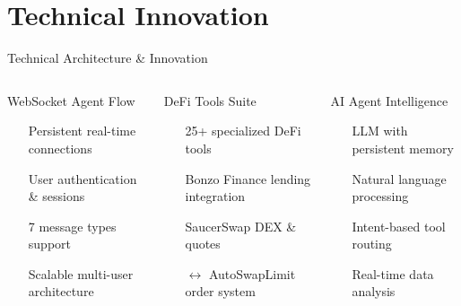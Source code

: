 \documentclass[aspectratio=169]{beamer}
\providecommand{\faExchangeAlt}{\faSync}
\providecommand{\faExpandArrowsAlt}{\ensuremath{\leftrightarrow}}
\providecommand{\faShieldAlt}{\faLock}
\providecommand{\faUsersCog}{\faUsers}
\providecommand{\faNetworkWired}{\faCogs}
\providecommand{\faLayerGroup}{\faCogs}
\begin{document}
\section{Technical Innovation}

\begin{frame}{Technical Architecture \& Innovation}
\vspace{0.05cm}
\begin{columns}
\begin{block}{WebSocket Agent Flow \hfill
{}}
\begin{itemize}
\item[\color{accent}\faPlug] Persistent real-time connections
\item[\color{accent}\faUsersCog] User authentication \& sessions
\item[\color{accent}\faExchangeAlt] 7 message types support
\item[\color{accent}\faNetworkWired] Scalable multi-user architecture
\end{itemize}
\end{block}

\begin{block}{DeFi Tools Suite \hfill
{}}
\begin{itemize}
\item[\color{secondary}\faCogs] 25+ specialized DeFi tools
\item[\color{secondary}\faShieldAlt] Bonzo Finance lending integration
\item[\color{secondary}\faExclamationCircle] SaucerSwap DEX \& quotes
\item[\color{secondary}\faExpandArrowsAlt] AutoSwapLimit order system
\end{itemize}
\end{block}

\begin{block}{AI Agent Intelligence \hfill
{}}
\begin{itemize}
\item[\color{success}\faStopwatch] LLM with persistent memory
\item[\color{success}\faChartLine] Natural language processing
\item[\color{success}\faLayerGroup] Intent-based tool routing
\item[\color{success}\faLink] Real-time data analysis
\end{itemize}
\end{block}


\end{columns}
\end{frame}
\end{document}

